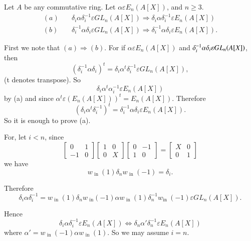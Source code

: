 \begin{Prop}\label{c3:Prop3.1}
Let $A$ be any commutative ring. Let $\alpha \varepsilon E_n(A[X])$,
and $n\geq 3$.
$$
\begin{aligned}
(a)\quad&\delta_i\alpha \delta^{-1}_i\varepsilon GL_n(A[X])\Rightarrow
  \delta_i\alpha\delta^{-1}_i\varepsilon E_n(A[X])\\
(b)\quad& \delta^{-1}_i\alpha\delta_i\varepsilon GL_n(A[X])\Rightarrow
  \delta^{-1}_i\alpha\delta_i\varepsilon E_n(A[X]).
\end{aligned}
$$
\end{Prop}

\begin{Proof}
First we note that $(a)\Rightarrow (b)$. For if $\alpha \varepsilon
E_n(A[X])$ and $\delta^{-1}_i\alpha\delta_i\varepsilon\\ GL_n(A[X])$,
then 
$$
\left(\delta^{-1}_i\alpha\delta_i\right)^{t}=\delta_i\alpha^{t}\delta^{-1}_i\varepsilon GL_n(A[X]),
$$
(t denotes transpose). So 
$$
\delta_i\alpha^{t}\alpha^{-1}_i\varepsilon E_n(A[X])
$$
by (a) and since $\alpha^{t}\varepsilon
(E_n(A[X]))^{t}=E_n(A[X])$. Therefore 
$$
\left(\delta_i\alpha^{t}\delta^{-1}_i\right)^{t}=\delta^{-1}_i\alpha\delta_i\varepsilon E_n(A[X]).
$$
So it is enough to prove (a).

For, let $i<n$, since 
$$
\begin{bmatrix}
0 & 1\\
-1 & 0
\end{bmatrix} \begin{bmatrix}
1 & 0\\
0 & X
\end{bmatrix} \begin{bmatrix}
0 & -1\\
1 & 0
\end{bmatrix} = \begin{bmatrix}
X & 0\\
0 & 1
\end{bmatrix}
$$
we have 
$$
w_{\text{ in }}(1)\delta_nw_{\text{ in }}(-1)=\delta_i.
$$

Therefore
$$
\delta_i\alpha\delta^{-1}_i=w_{\text{ in }}(1)\delta_nw_{\text{ in
}}(-1)\alpha w_{\text{ in }}(1)\delta^{-1}_nw_{\text{
    in }}(-1)\varepsilon GL_n(A[X]).
$$

Hence
$$
\delta_i\alpha\delta^{-1}_i\varepsilon E_n(A[X])\Leftrightarrow
\delta_n\alpha'\delta^{-1}_n\varepsilon E_n(A[X])
$$
where $\alpha'=w_{\text{ in }}(-1)\alpha w_{\text{ in }}(1)$. So we
may assume $i=n$. 
\enprf
\end{Proof}

